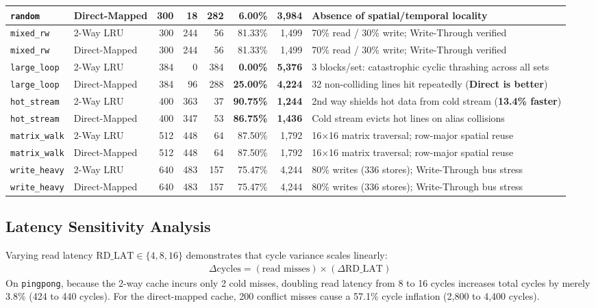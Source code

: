 \documentclass[journal,10pt,twocolumn]{IEEEtran}
\begin{document}
\begin{table}[htbp]
\begin{tabular}{llrrrrrl}
\texttt{random} & Direct-Mapped & 300 & 18 & 282 & \textbf{6.00\%} & \textbf{3,984} & Absence of spatial/temporal locality \\
\midrule
\texttt{mixed\_rw} & 2-Way LRU & 300 & 244 & 56 & 81.33\% & 1,499 & 70\% read / 30\% write; Write-Through verified \\
\texttt{mixed\_rw} & Direct-Mapped & 300 & 244 & 56 & 81.33\% & 1,499 & 70\% read / 30\% write; Write-Through verified \\
\midrule
\texttt{large\_loop} & 2-Way LRU & 384 & 0 & 384 & \textbf{0.00\%} & \textbf{5,376} & 3 blocks/set: catastrophic cyclic thrashing across all sets \\
\texttt{large\_loop} & Direct-Mapped & 384 & 96 & 288 & \textbf{25.00\%} & \textbf{4,224} & 32 non-colliding lines hit repeatedly (\textbf{Direct is better}) \\
\midrule
\texttt{hot\_stream} & 2-Way LRU & 400 & 363 & 37 & \textbf{90.75\%} & \textbf{1,244} & 2nd way shields hot data from cold stream (\textbf{13.4\% faster}) \\
\texttt{hot\_stream} & Direct-Mapped & 400 & 347 & 53 & \textbf{86.75\%} & \textbf{1,436} & Cold stream evicts hot lines on alias collisions \\
\midrule
\texttt{matrix\_walk} & 2-Way LRU & 512 & 448 & 64 & 87.50\% & 1,792 & 16$\times$16 matrix traversal; row-major spatial reuse \\
\texttt{matrix\_walk} & Direct-Mapped & 512 & 448 & 64 & 87.50\% & 1,792 & 16$\times$16 matrix traversal; row-major spatial reuse \\
\midrule
\texttt{write\_heavy} & 2-Way LRU & 640 & 483 & 157 & 75.47\% & 4,244 & 80\% writes (336 stores); Write-Through bus stress \\
\texttt{write\_heavy} & Direct-Mapped & 640 & 483 & 157 & 75.47\% & 4,244 & 80\% writes (336 stores); Write-Through bus stress \\
\bottomrule
\end{tabular}
\end{table}

\subsection{Latency Sensitivity Analysis}
Varying read latency $\text{RD\_LAT} \in \{4, 8, 16\}$ demonstrates that cycle variance scales linearly:
\begin{align*}
    \Delta\text{cycles} = (\text{read misses}) \times (\Delta\text{RD\_LAT})
\end{align*}
On \texttt{pingpong}, because the 2-way cache incurs only 2 cold misses, doubling read latency from 8 to 16 cycles increases total cycles by merely 3.8\% (424 to 440 cycles). For the direct-mapped cache, 200 conflict misses cause a 57.1\% cycle inflation (2,800 to 4,400 cycles).
\end{document}

